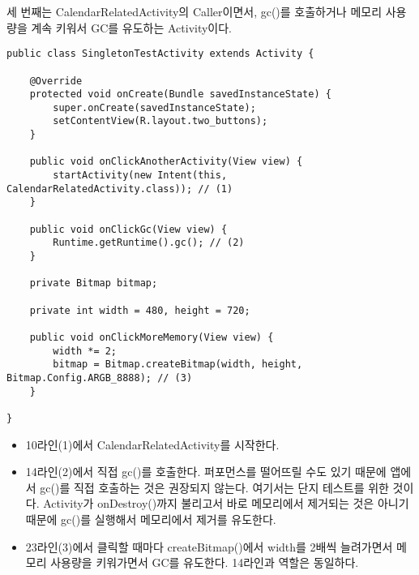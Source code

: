 세 번째는 CalendarRelatedActivity의 Caller이면서, gc()를 호출하거나 메모리 사용량을 계속 키워서 GC를 유도하는 Activity이다.
\begin{lstlisting}[frame=single]
public class SingletonTestActivity extends Activity {

    @Override
    protected void onCreate(Bundle savedInstanceState) {
        super.onCreate(savedInstanceState);
        setContentView(R.layout.two_buttons);
    }

    public void onClickAnotherActivity(View view) { 
        startActivity(new Intent(this, CalendarRelatedActivity.class)); // (1)
    }
    
	public void onClickGc(View view) {
		Runtime.getRuntime().gc(); // (2)
	}
	
    private Bitmap bitmap;

    private int width = 480, height = 720;

    public void onClickMoreMemory(View view) { 
        width *= 2;
        bitmap = Bitmap.createBitmap(width, height, Bitmap.Config.ARGB_8888); // (3)
    }

}
\end{lstlisting}
\begin{itemize}
\item 10라인(1)에서 CalendarRelatedActivity를 시작한다.

\item 14라인(2)에서 직접 gc()를 호출한다. 퍼포먼스를 떨어뜨릴 수도 있기 때문에 앱에서 gc()를 직접 호출하는 것은 권장되지 않는다. 
여기서는 단지 테스트를 위한 것이다. Activity가 onDestroy()까지 불리고서 바로 메모리에서 제거되는 것은 아니기 때문에 gc()를 실행해서 메모리에서 제거를 유도한다.

\item 23라인(3)에서 클릭할 때마다 createBitmap()에서 width를 2배씩 늘려가면서 메모리 사용량을 키워가면서 GC를 유도한다. 14라인과 역할은 동일하다.
\end{itemize}


